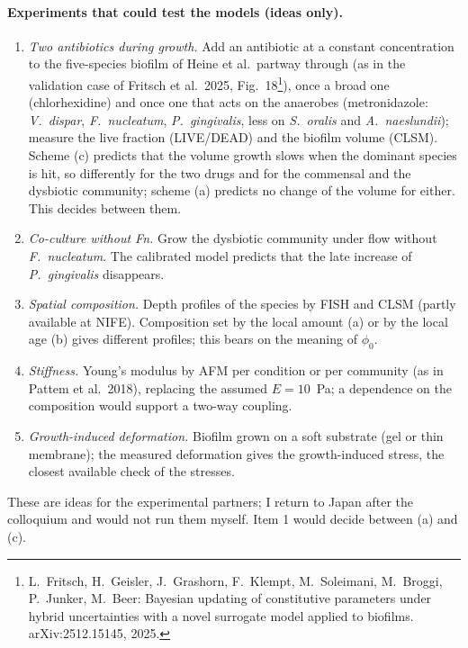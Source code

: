 \documentclass[11pt,a4paper]{article}
\begin{document}
\paragraph{Experiments that could test the models (ideas only).}
\begin{enumerate}
\item \emph{Two antibiotics during growth.} Add an antibiotic at a constant
  concentration to the five-species biofilm of Heine et al.\ partway through
  (as in the validation case of Fritsch et al.\ 2025, Fig.~18\footnote{L.~Fritsch, H.~Geisler, J.~Grashorn, F.~Klempt, M.~Soleimani, M.~Broggi, P.~Junker, M.~Beer: Bayesian updating of constitutive parameters under hybrid uncertainties with a novel surrogate model applied to biofilms. arXiv:2512.15145, 2025.}), once a broad one
  (chlorhexidine) and once one that acts on the anaerobes (metronidazole:
  \textit{V.~dispar}, \textit{F.~nucleatum}, \textit{P.~gingivalis}, less on
  \textit{S.~oralis} and \textit{A.~naeslundii}); measure the live fraction
  (LIVE/DEAD) and the biofilm volume (CLSM). Scheme (c) predicts that the volume
  growth slows when the dominant species is hit, so differently for the two drugs
  and for the commensal and the dysbiotic community; scheme (a) predicts no
  change of the volume for either. This decides between them.
\item \emph{Co-culture without Fn.} Grow the dysbiotic community under flow without
  \textit{F.~nucleatum}. The calibrated model predicts that the late increase of
  \textit{P.~gingivalis} disappears.
\item \emph{Spatial composition.} Depth profiles of the species by FISH and CLSM
  (partly available at NIFE). Composition set by the local amount (a) or by the
  local age (b) gives different profiles; this bears on the meaning of $\phi_0$.
\item \emph{Stiffness.} Young's modulus by AFM per condition or per community
  (as in Pattem et al.\ 2018), replacing the assumed $E=10$~Pa; a dependence on
  the composition would support a two-way coupling.
\item \emph{Growth-induced deformation.} Biofilm grown on a soft substrate (gel or
  thin membrane); the measured deformation gives the growth-induced stress, the
  closest available check of the stresses.
\end{enumerate}
These are ideas for the experimental partners; I return to Japan after the
colloquium and would not run them myself. Item 1 would decide between (a) and (c).
\end{document}
